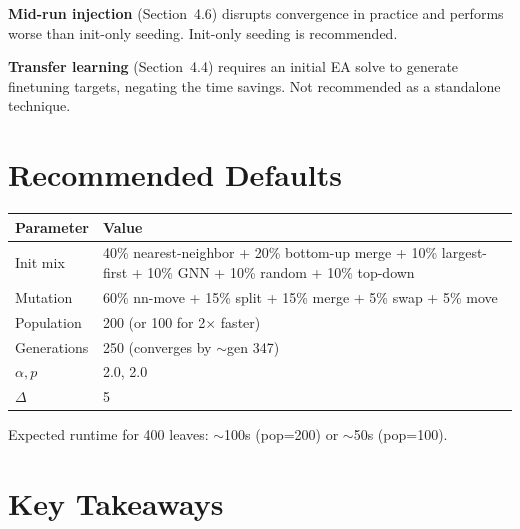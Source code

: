\documentclass[11pt,a4paper]{article}
\begin{document}
\textbf{Mid-run injection} (Section~4.6) disrupts convergence in practice and performs worse than init-only seeding.  Init-only seeding is recommended.

\textbf{Transfer learning} (Section~4.4) requires an initial EA solve to generate finetuning targets, negating the time savings.  Not recommended as a standalone technique.

\section{Recommended Defaults}

\begin{table}[H]
\centering
\begin{tabular}{ll}
\toprule
\textbf{Parameter} & \textbf{Value} \\
\midrule
Init mix & 40\% nearest-neighbor + 20\% bottom-up merge + 10\% largest-first + 10\% GNN + 10\% random + 10\% top-down \\
Mutation & 60\% nn-move + 15\% split + 15\% merge + 5\% swap + 5\% move \\
Population & 200 (or 100 for 2$\times$ faster) \\
Generations & 250 (converges by $\sim$gen 347) \\
$\alpha, p$ & 2.0, 2.0 \\
$\Delta$ & 5 \\
\bottomrule
\end{tabular}
\end{table}

Expected runtime for 400 leaves: $\sim$100s (pop=200) or $\sim$50s (pop=100).

\section{Key Takeaways}
\end{document}
